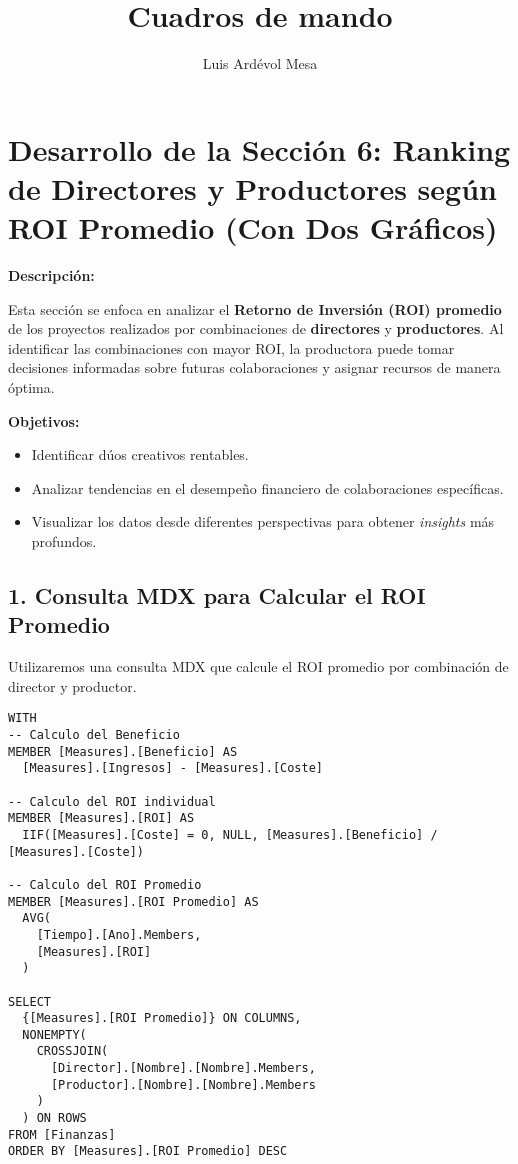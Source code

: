 \documentclass[11pt]{opticajnl}
\title{Cuadros de mando}
\author[1,2,3]{Luis Ardévol Mesa}
\begin{document}
\maketitle
\section{Desarrollo de la Sección 6: Ranking de Directores y Productores según ROI Promedio (Con Dos Gráficos)}

\textbf{Descripción:}

Esta sección se enfoca en analizar el \textbf{Retorno de Inversión (ROI) promedio} de los proyectos realizados por combinaciones de \textbf{directores} y \textbf{productores}. Al identificar las combinaciones con mayor ROI, la productora puede tomar decisiones informadas sobre futuras colaboraciones y asignar recursos de manera óptima.

\textbf{Objetivos:}

\begin{itemize}
    \item Identificar dúos creativos rentables.
    \item Analizar tendencias en el desempeño financiero de colaboraciones específicas.
    \item Visualizar los datos desde diferentes perspectivas para obtener \textit{insights} más profundos.
\end{itemize}

\subsection{1. Consulta MDX para Calcular el ROI Promedio}

Utilizaremos una consulta MDX que calcule el ROI promedio por combinación de director y productor.

\begin{lstlisting}[style=terminal]
WITH 
-- Calculo del Beneficio
MEMBER [Measures].[Beneficio] AS 
  [Measures].[Ingresos] - [Measures].[Coste]

-- Calculo del ROI individual
MEMBER [Measures].[ROI] AS 
  IIF([Measures].[Coste] = 0, NULL, [Measures].[Beneficio] / [Measures].[Coste])

-- Calculo del ROI Promedio
MEMBER [Measures].[ROI Promedio] AS 
  AVG(
    [Tiempo].[Ano].Members,
    [Measures].[ROI]
  )

SELECT 
  {[Measures].[ROI Promedio]} ON COLUMNS,
  NONEMPTY(
    CROSSJOIN(
      [Director].[Nombre].[Nombre].Members,
      [Productor].[Nombre].[Nombre].Members
    )
  ) ON ROWS
FROM [Finanzas]
ORDER BY [Measures].[ROI Promedio] DESC
\end{lstlisting}
\end{document}
